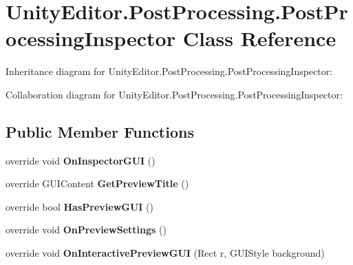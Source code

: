 \hypertarget{class_unity_editor_1_1_post_processing_1_1_post_processing_inspector}{}\section{Unity\+Editor.\+Post\+Processing.\+Post\+Processing\+Inspector Class Reference}
\label{class_unity_editor_1_1_post_processing_1_1_post_processing_inspector}


Inheritance diagram for Unity\+Editor.\+Post\+Processing.\+Post\+Processing\+Inspector\+:


Collaboration diagram for Unity\+Editor.\+Post\+Processing.\+Post\+Processing\+Inspector\+:
\subsection*{Public Member Functions}
\begin{DoxyCompactItemize}
\item 
\mbox{\label{class_unity_editor_1_1_post_processing_1_1_post_processing_inspector_a8fbf38f6c6365ae3a4905a077761ebcd}} 
override void {\bfseries On\+Inspector\+G\+UI} ()
\item 
\mbox{\label{class_unity_editor_1_1_post_processing_1_1_post_processing_inspector_a42ae8ca761c76f9b17ec24d81c18fd27}} 
override G\+U\+I\+Content {\bfseries Get\+Preview\+Title} ()
\item 
\mbox{\label{class_unity_editor_1_1_post_processing_1_1_post_processing_inspector_a18c9095836c4ebb4131e0e15f63b4b11}} 
override bool {\bfseries Has\+Preview\+G\+UI} ()
\item 
\mbox{\label{class_unity_editor_1_1_post_processing_1_1_post_processing_inspector_a1ef98fbdba8a625de358aac76370fdd6}} 
override void {\bfseries On\+Preview\+Settings} ()
\item 
\mbox{\label{class_unity_editor_1_1_post_processing_1_1_post_processing_inspector_a08cf912416a9603599f2837e298e3ce8}} 
override void {\bfseries On\+Interactive\+Preview\+G\+UI} (Rect r, G\+U\+I\+Style background)
\end{DoxyCompactItemize}
